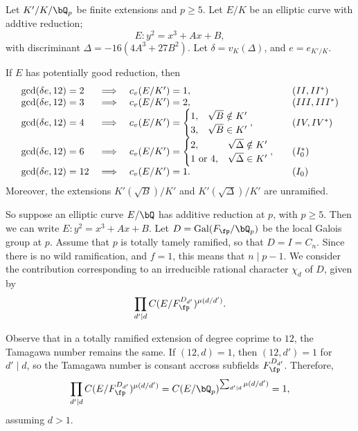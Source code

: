 \begin{lemma}
    Let $K' /K / \bQ_p$ be finite extensions and $p \geq 5$. Let $E / K$ be an elliptic curve with addtive reduction; 
    \[ E \colon y^2 = x^3 + Ax + B, \]
    with discriminant $\Delta = -16(4 A^3 + 27 B^2)$. Let $\delta = v_K(\Delta)$, and $e = e_{K' / K}$.

    If $E$ has potentially good reduction, then 
        \[
        \begin{array}{l l l l}
            \gcd(\delta e, 12) = 2 & \implies & c_v(E / K') = 1, & \quad (II, II^*) \\
            \gcd(\delta e, 12) = 3 & \implies & c_v(E / K') = 2, & \quad (III, III^*) \\
            \gcd(\delta e, 12) = 4 & \implies & c_v(E / K') = \begin{cases} 1, & \sqrt{B} \notin K'
                                \\ 3, & \sqrt{B} \in K' \end{cases}, & \quad (IV, IV^*) \\
            \gcd(\delta e, 12) = 6 & \implies & c_v(E / K') = \begin{cases} 2, & \sqrt{\Delta} \notin K'
                \\ 1 \ \text{or} \ 4, & \sqrt{\Delta} \in K' \end{cases}, & \quad (I_0^*) \\
            \gcd(\delta e, 12) = 12 & \implies & c_v(E / K') = 1. & \quad (I_0)
        \end{array}
        \]
    Moreover, the extensions $K'(\sqrt{B}) / K'$ and $K'(\sqrt{\Delta}) / K'$ are unramified.
\end{lemma}

So suppose an elliptic curve $E / \bQ$ has additive reduction at $p$, with $p \geq 5$. Then we can write $E \colon y^2 = x^3 + Ax + B$. Let $D = \Gal(F_{\fp} / \bQ_p)$ be the local Galois group at $p$. Assume that $p$ is totally tamely ramified, so that $D = I = C_n$. Since there is no wild ramification, and $f = 1$, this means that $n \mid p - 1$. We consider the contribution corresponding to an irreducible rational character $\chi_d$ of $D$, given by 
\begin{equation}\label{tam-contrib}
\prod_{d ' \mid d} C(E / F_{\fp}^{D_{d'}})^{\mu(d / d')}.
\end{equation}

Observe that in a totally ramified extension of degree coprime to $12$, the Tamagawa number remains the same. If $(12, d) = 1$, then $(12, d') = 1$ for $d' \mid  d$, so the Tamagawa number is consant accross subfields $F_{\fp}^{D_{d'}}$. Therefore,
\[\prod_{d ' \mid d} C(E / F_{\fp}^{D_{d'}})^{\mu(d / d')} = C(E / \bQ_p)^{\sum_{d' \mid d} \mu(d / d')} = 1,\]
assuming $d > 1$. 

